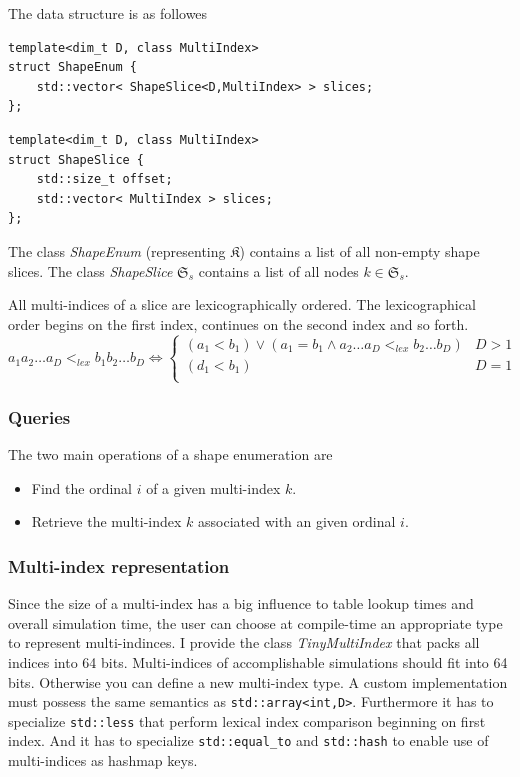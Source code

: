 \documentclass{article}
\def\code#1{\texttt{#1}}
\def\classname#1{\textit{#1}}
\begin{document}
The data structure is as followes

\begin{verbatim}
template<dim_t D, class MultiIndex>
struct ShapeEnum {
    std::vector< ShapeSlice<D,MultiIndex> > slices;
};
\end{verbatim}

\begin{verbatim}
template<dim_t D, class MultiIndex>
struct ShapeSlice {
    std::size_t offset;
    std::vector< MultiIndex > slices;
};
\end{verbatim}

The class \classname{ShapeEnum} (representing \(\mathfrak{K}\)) contains a list
of all non-empty shape slices. The class \classname{ShapeSlice}
\(\mathfrak{S}_s\) contains a list of all nodes \(k \in \mathfrak{S}_s\).

All multi-indices of a slice are lexicographically ordered.
The lexicographical order begins on the first index, continues on the second index and so forth.
\begin{equation}
  \label{eq:lexical_order}
  a_1a_2\dots a_D <_{lex}b_1b_2\dots b_D \iff 
  \begin{cases}
    (a_1 < b_1) \lor (a_1 = b_1 \land a_2\dots a_D <_{lex} b_2\dots b_D) & D > 1 \\
    (d_1 < b_1) & D = 1 \\
  \end{cases}
\end{equation}

\subsubsection{Queries}
The two main operations of a shape enumeration are
\begin{itemize}
\item Find the ordinal \(i\) of a given multi-index \(k\).
  
\item Retrieve the multi-index \(k\) associated with an given ordinal \(i\).
  
\end{itemize}

\subsubsection{Multi-index representation}
Since the size of a multi-index has a big influence to table lookup times and
overall simulation time, the user can choose at compile-time an appropriate
type to represent multi-indinces. I provide the class \classname{TinyMultiIndex}
that packs all indices into 64 bits.
Multi-indices of accomplishable simulations should fit into 64 bits.
Otherwise you can define a new multi-index type. A custom implementation
must possess the same semantics as \code{std::array<int,D>}.
Furthermore it has to specialize \code{std::less} that perform lexical index comparison
beginning on first index.
And it has to specialize \code{std::equal\_to} and \code{std::hash} to
enable use of multi-indices as hashmap keys.
\end{document}
